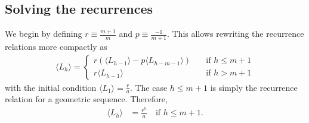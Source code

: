 \subsection{Solving the recurrences}
We begin by defining $r \equiv \frac{m+1}{m}$ and $p \equiv \frac{-1}{m+1}$. This allows rewriting the recurrence relations more compactly as
\begin{align}\label{eq:complexRecurrence2}
	\boxed{\langle L_h \rangle = \begin{cases}
        r\left(\langle L_{h-1}\rangle - p\langle L_{h-m-1}\rangle \right) &\quad \mbox{if } h \leq m+1\\
        r\langle L_{h-1}\rangle &\quad \mbox{if } h > m+1
	\end{cases}}
\end{align}
with the initial condition $\langle L_1 \rangle = \frac{r}{a}$.
The case $h \leq m+1$ is simply the recurrence relation for a geometric sequence. Therefore,
\begin{align}\label{eq:geomProgression}
    \langle L_h \rangle &= \frac{r^h}{a} \quad \mbox{if } h \leq m+1.
\end{align}

